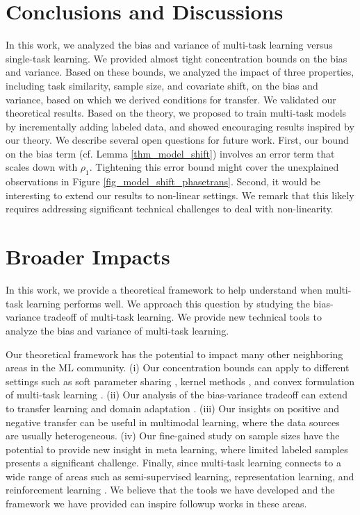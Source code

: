 

\section{Conclusions and Discussions}

In this work, we analyzed the bias and variance of multi-task learning versus single-task learning.
We provided almost tight concentration bounds on the bias and variance.
Based on these bounds, we analyzed the impact of three properties, including task similarity, sample size, and covariate shift, on the bias and variance, based on which we derived conditions for transfer.
We validated our theoretical results.
Based on the theory, we proposed to train multi-task models by incrementally adding labeled data, and showed encouraging results inspired by our theory.
We describe several open questions for future work.
First, our bound on the bias term (cf. Lemma \ref{thm_model_shift}) involves an error term that scales down with $\rho_1$.
Tightening this error bound might cover the unexplained observations in Figure \ref{fig_model_shift_phasetrans}.
Second, it would be interesting to extend our results to non-linear settings.
We remark that this likely requires addressing significant technical challenges  to deal with non-linearity.


\iffalse
\newpage
\section*{Broader Impacts}

In this work, we provide a theoretical framework to help understand when multi-task learning performs well.
We approach this question by studying the bias-variance tradeoff of multi-task learning.
We provide new technical tools to analyze the bias and variance of multi-task learning.

Our theoretical framework has the potential to impact many other neighboring areas in the ML community.
(i) Our concentration bounds can apply to different settings such as soft parameter sharing \cite{R17} , kernel methods \cite{EMP05}, and convex formulation of multi-task learning \cite{ZY14}.
(ii) Our analysis of the bias-variance tradeoff can extend to transfer learning and domain adaptation \cite{K18}.
(iii) Our insights on positive and negative transfer can be useful in multimodal learning, where the data sources are usually heterogeneous.
(iv) Our fine-gained study on sample sizes have the potential to provide new insight in meta learning, where limited labeled samples presents a significant challenge.
Finally, since multi-task learning connects to a wide range of areas \cite{V20} such as semi-supervised learning, representation learning, and reinforcement learning \cite{YKGLHF20}.%
We believe that the tools we have developed and the framework we have provided can inspire followup works in these areas.

